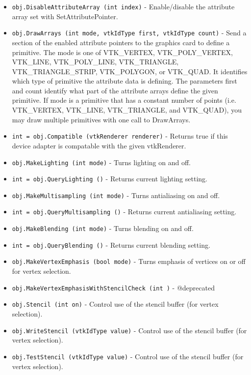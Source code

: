 \begin{itemize}
\item  \verb|obj.DisableAttributeArray (int index)| -  Enable/disable the attribute array set with SetAttributePointer.

\item  \verb|obj.DrawArrays (int mode, vtkIdType first, vtkIdType count)| -  Send a section of the enabled attribute pointers to the graphics card
 to define a primitive.  The mode is one of VTK\_VERTEX,
 VTK\_POLY\_VERTEX, VTK\_LINE, VTK\_POLY\_LINE, VTK\_TRIANGLE,
 VTK\_TRIANGLE\_STRIP, VTK\_POLYGON, or VTK\_QUAD.  It identifies which
 type of primitive the attribute data is defining.  The parameters
 first and count identify what part of the attribute arrays define the
 given primitive.  If mode is a primitive that has a constant number of
 points (i.e. VTK\_VERTEX, VTK\_LINE, VTK\_TRIANGLE, and VTK\_QUAD), you
 may draw multiple primitives with one call to DrawArrays.

\item  \verb|int = obj.Compatible (vtkRenderer renderer)| -  Returns true if this device adapter is compatable with the given
 vtkRenderer.

\item  \verb|obj.MakeLighting (int mode)| -  Turns lighting on and off.

\item  \verb|int = obj.QueryLighting ()| -  Returns current lighting setting.

\item  \verb|obj.MakeMultisampling (int mode)| -  Turns antialiasing on and off.

\item  \verb|int = obj.QueryMultisampling ()| -  Returns current antialiasing setting.

\item  \verb|obj.MakeBlending (int mode)| -  Turns blending on and off.

\item  \verb|int = obj.QueryBlending ()| -  Returns current blending setting.

\item  \verb|obj.MakeVertexEmphasis (bool mode)| -  Turns emphasis of vertices on or off for vertex selection.

\item  \verb|obj.MakeVertexEmphasisWithStencilCheck (int )| -  @deprecated

\item  \verb|obj.Stencil (int on)| -  Control use of the stencil buffer (for vertex selection).

\item  \verb|obj.WriteStencil (vtkIdType value)| -  Control use of the stencil buffer (for vertex selection).

\item  \verb|obj.TestStencil (vtkIdType value)| -  Control use of the stencil buffer (for vertex selection).

\end{itemize}
